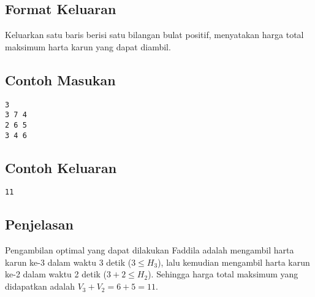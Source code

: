 \documentclass{article}
\begin{document}
\subsection*{Format Keluaran}

Keluarkan satu baris berisi satu bilangan bulat positif, menyatakan harga total maksimum harta karun yang dapat diambil.
\\

\begin{multicols}{2}
\subsection*{Contoh Masukan}
\begin{lstlisting}
3
3 7 4
2 6 5
3 4 6
\end{lstlisting}
\columnbreak
\subsection*{Contoh Keluaran}
\begin{lstlisting}
11
\end{lstlisting}
\vfill
\null
\end{multicols}

\subsection*{Penjelasan}
Pengambilan optimal yang dapat dilakukan Faddila adalah mengambil harta karun ke-3 dalam waktu 3 detik ($3 \leq H_3$), lalu kemudian mengambil harta karun ke-2 dalam waktu 2 detik ($3 + 2 \leq H_2$). Sehingga harga total maksimum yang didapatkan adalah $V_3 + V_2 = 6 + 5 = 11$.

\pagebreak
\end{document}
